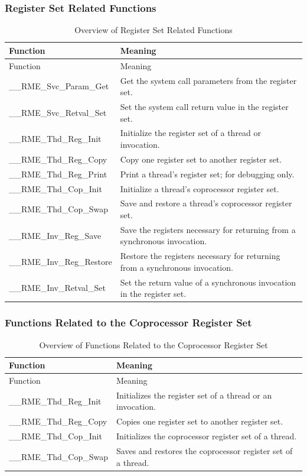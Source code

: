 \subsubsection{Register Set Related Functions}\label{subsubsec:7-register-set-functions}

\begin{xltabular}{\textwidth}{@{}>{\hsize\raggedright\arraybackslash}X>{\hsize\raggedright\arraybackslash}X@{}}
\caption{Overview of Register Set Related Functions}\label{tab:7-11-register-set-functions-overview}\\
\toprule
Function & Meaning\tabularnewline
\endfirsthead
\toprule
Function & Meaning\tabularnewline
\midrule
\endhead
\bottomrule
\endlastfoot
\_\_RME\_Svc\_Param\_Get & Get the system call parameters from the register set.\tabularnewline
\_\_RME\_Svc\_Retval\_Set &
Set the system call return value in the register set.\tabularnewline
\_\_RME\_Thd\_Reg\_Init &
Initialize the register set of a thread or invocation.\tabularnewline
\_\_RME\_Thd\_Reg\_Copy &
Copy one register set to another register set.\tabularnewline
\_\_RME\_Thd\_Reg\_Print &
Print a thread's register set; for debugging only.\tabularnewline
\_\_RME\_Thd\_Cop\_Init & Initialize a thread's coprocessor register set.\tabularnewline
\_\_RME\_Thd\_Cop\_Swap &
Save and restore a thread's coprocessor register set.\tabularnewline
\_\_RME\_Inv\_Reg\_Save &
Save the registers necessary for returning from a synchronous invocation.\tabularnewline
\_\_RME\_Inv\_Reg\_Restore &
Restore the registers necessary for returning from a synchronous invocation.\tabularnewline
\_\_RME\_Inv\_Retval\_Set &
Set the return value of a synchronous invocation in the register set.\tabularnewline
\end{xltabular}
\nopagebreak[4]

\subsubsection{Functions Related to the Coprocessor Register Set}\label{subsubsec:7-coprocessor-register-set-functions}



\begin{xltabular}{\textwidth}{@{}>{\hsize\raggedright\arraybackslash}X>{\hsize\raggedright\arraybackslash}X@{}}
\caption{Overview of Functions Related to the Coprocessor Register Set}\label{tab:7-12-coprocessor-register-set-functions-overview}\\
\toprule
Function & Meaning\tabularnewline
\endfirsthead
\toprule
Function & Meaning\tabularnewline
\midrule
\endhead
\bottomrule
\endlastfoot
\_\_RME\_Thd\_Reg\_Init &
Initializes the register set of a thread or an invocation.\tabularnewline
\_\_RME\_Thd\_Reg\_Copy &
Copies one register set to another register set.\tabularnewline
\_\_RME\_Thd\_Cop\_Init & Initializes the coprocessor register set of a thread.\tabularnewline
\_\_RME\_Thd\_Cop\_Swap &
Saves and restores the coprocessor register set of a thread.\tabularnewline
\end{xltabular}
\nopagebreak[4]

